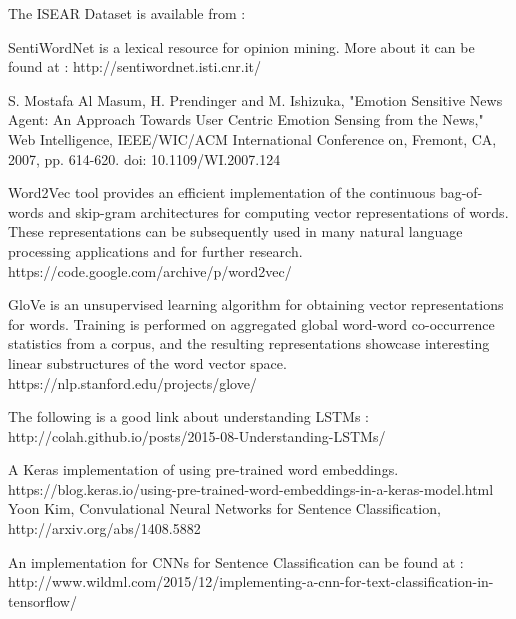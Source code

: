 \documentclass[conference]{IEEEtran}
\numberwithin{equation}{section}
\numberwithin{figure}{section}
\numberwithin{table}{section}
\begin{document}
%
%
%
\begin{thebibliography}{1}
The ISEAR Dataset is available from : 

SentiWordNet is a lexical resource for opinion mining. More about it can be found at : http://sentiwordnet.isti.cnr.it/

S. Mostafa Al Masum, H. Prendinger and M. Ishizuka, "Emotion Sensitive News Agent: An Approach Towards User Centric Emotion Sensing from the News," Web Intelligence, IEEE/WIC/ACM International Conference on, Fremont, CA, 2007, pp. 614-620.
doi: 10.1109/WI.2007.124

Word2Vec tool provides an efficient implementation of the continuous bag-of-words and skip-gram architectures for computing vector representations of words. These representations can be subsequently used in many natural language processing applications and for further research. https://code.google.com/archive/p/word2vec/

GloVe is an unsupervised learning algorithm for obtaining vector representations for words. Training is performed on aggregated global word-word co-occurrence statistics from a corpus, and the resulting representations showcase interesting linear substructures of the word vector space. https://nlp.stanford.edu/projects/glove/

The following is a good link about understanding LSTMs : http://colah.github.io/posts/2015-08-Understanding-LSTMs/

A Keras implementation of using pre-trained word embeddings.
https://blog.keras.io/using-pre-trained-word-embeddings-in-a-keras-model.html
Yoon Kim, Convulational Neural Networks for Sentence Classification, http://arxiv.org/abs/1408.5882

An implementation for CNNs for Sentence Classification can be found at : http://www.wildml.com/2015/12/implementing-a-cnn-for-text-classification-in-tensorflow/

\end{thebibliography}
\end{document}
